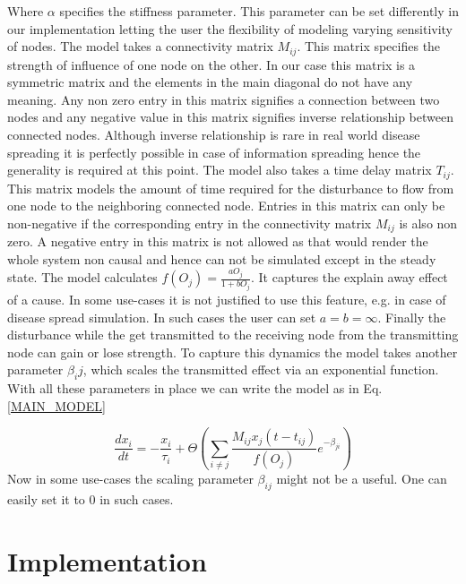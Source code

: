 \documentclass[11pt]{article}
\begin{document}
 Where $\alpha$ specifies the stiffness parameter. This parameter can be set differently in our implementation letting the user the flexibility of modeling varying sensitivity of nodes. The model takes a connectivity matrix $M_{ij}$. This matrix specifies the strength of influence of one node on the other. In our case this matrix is a symmetric matrix and the elements in the main diagonal do not have any meaning. Any non zero entry in this matrix signifies a connection between two nodes and any negative value in this matrix signifies inverse relationship between connected nodes. Although inverse relationship is rare in real world disease spreading it is perfectly possible in case of information spreading hence the generality is required at this point. The model also takes a time delay matrix $T_{ij}$. This matrix models the amount of time required for the disturbance to flow from one node to the neighboring connected node. Entries in this matrix can only be non-negative if the corresponding entry in the connectivity matrix $M_{ij}$ is also non zero. A negative entry in this matrix is not allowed as that would render the whole system non causal and hence can not be simulated except in the steady state. The model calculates $f(O_j) = \frac{aO_j}{1+bO_j}$. It captures the explain away effect of a cause. In some use-cases it is not justified to use this feature, e.g. in case of disease spread simulation. In such cases the user can set $a=b=\infty$. Finally the disturbance while the get transmitted to the receiving node from the transmitting node can gain or lose strength. To capture this dynamics the model takes another parameter $\beta_ij$, which scales the transmitted effect via an exponential function. With all these parameters in place we can write the model as in Eq.\ref{MAIN_MODEL}

\begin{equation}
\frac{dx_i}{dt} = -\frac{x_i}{\tau_i}+\Theta\left(\sum_{i\ne j}{\frac{M_{ij}x_j(t-t_{ij})}{f(O_j)}e^{-\beta_{ji}}}\right) 
\label{MAIN_MODEL}
\end{equation}
Now in some use-cases the scaling parameter $\beta_{ij}$ might not be a useful. One can easily set it to $0$ in such cases.
\section{Implementation}

\newpage
\end{document}
